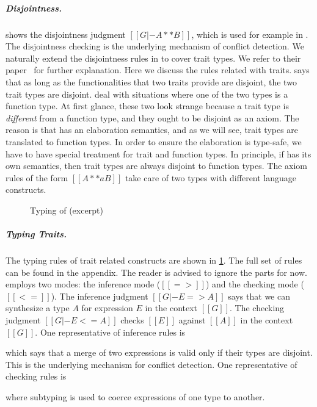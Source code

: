 \subparagraph{Disjointness.}
 shows the disjointness judgment $[[G |- A ** B]]$, which is
used for example in . The disjointness checking is the underlying
mechanism of conflict detection. We naturally extend the disjointness rules in
\bname to cover trait types. We refer to
their paper~\cite{alpuimdisjoint} for further explanation. Here we discuss
the rules
related with traits.  says that as long as the functionalities
that two traits provide are disjoint, the two trait types are disjoint.
 deal with situations where one of the two types
is a function type. At first glance, these two look strange because a trait type is
\textit{different} from a function type, and they ought to be disjoint as an axiom. The reason
is that \name has an elaboration semantics, and as we will see, trait types are translated to function
types. In order to ensure the elaboration is type-safe, we have to have special treatment for trait
and function types. In principle, if \name has its own semantics, then trait types are always disjoint
to function types. The axiom rules of the form $[[ A **a B ]]$ take care of two types with different language constructs.

\begin{figure}[t]
  \centering
  \begin{small}
  \end{small}
  \caption{Typing of \name (excerpt)}
  \label{fig:type}
\end{figure}

\renewcommand\ottaltinferrule[4]{
  \inferrule*[narrower=0.9,right=#1,#2]
    {#3}
    {#4}
}
\subparagraph{Typing Traits.}
The typing rules of trait related constructs are shown in \cref{fig:type}. The full set of rules can be found in the appendix.
The reader is advised to ignore the  parts for now.
\name employs two modes: the inference mode
($[[=>]]$) and the checking mode ($[[<=]]$). The inference judgment $[[ G |- E => A]]$
says that we can synthesize a type $A$ for expression $E$ in the context
$[[G]]$. The checking judgment $[[G |- E <= A]]$ checks $[[E]]$ against $[[A]]$
in the context $[[G]]$. One representative of inference rules is
\begin{small}
\begin{mathpar}
\end{mathpar}
\end{small}
which says that a merge of two expressions is valid only if their types are disjoint. This is the underlying
mechanism for conflict detection. One representative of checking rules is
\begin{small}
\begin{mathpar}
\end{mathpar}
\end{small}
where subtyping is used to coerce expressions of one type to another.

